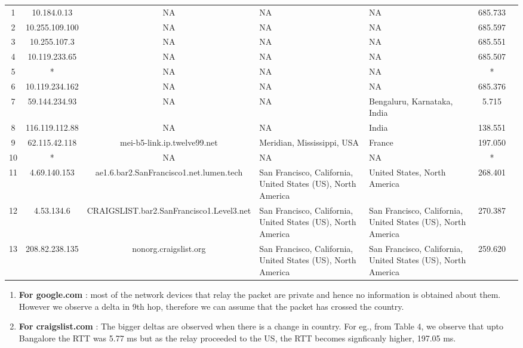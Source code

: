 \documentclass[12pt]{article}
\begin{document}
\begin{enumerate}
\begin{table}[h!]
{\begin{tabular}{|c|c|c| >{\centering\arraybackslash}m{} | >{\centering\arraybackslash}m{} |c|c|}
            \hline
            1 & 10.184.0.13 & NA & NA & NA & 685.733 \\
            2 & 10.255.109.100 & NA & NA & NA & 685.597 \\
            3 & 10.255.107.3 & NA & NA & NA & 685.551 \\
            4 & 10.119.233.65 & NA & NA & NA & 685.507 \\
            5 & * & NA & NA & NA & * \\
            6 & 10.119.234.162 & NA & NA & NA & 685.376 \\
            7 & 59.144.234.93 & NA & NA & Bengaluru, Karnataka, India & 5.715 \\
            8 & 116.119.112.88 & NA & NA & India & 138.551 \\
            9 & 62.115.42.118 & mei-b5-link.ip.twelve99.net & Meridian, Mississippi, USA & France & 197.050 \\
            10 & * & NA & NA & NA & * \\
            11 & 4.69.140.153 & ae1.6.bar2.SanFrancisco1.net.lumen.tech & San Francisco, California, United States (US), North America & United States, North America & 268.401 \\
            12 & 4.53.134.6 & CRAIGSLIST.bar2.SanFrancisco1.Level3.net & San Francisco, California, United States (US), North America & San Francisco, California, United States (US), North America & 270.387 \\
            13 & 208.82.238.135 & nonorg.craigslist.org & San Francisco, California, United States (US), North America & San Francisco, California, United States (US), North America & 259.620 \\
            \hline
        \end{tabular}}
    \end{table}

    \begin{enumerate}
        \item \textbf{For google.com} : most of the network devices that relay the packet are private and hence no information is obtained about them. However we observe a delta in 9th hop, therefore we can assume that the packet has crossed the country.
        \item \textbf{For craigslist.com} : The bigger deltas are observed when there is a change in country. For eg., from Table 4, we observe that upto Bangalore the RTT was 5.77 ms but as the relay proceeded to the US, the RTT becomes signficanly higher, 197.05 ms. 
    \end{enumerate}


\end{enumerate}
\end{document}
